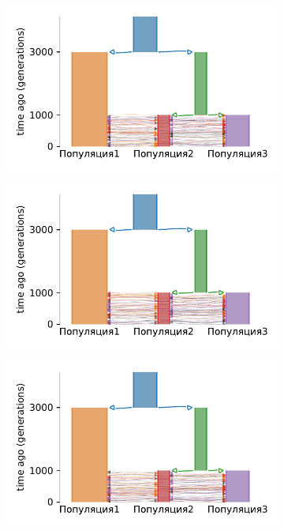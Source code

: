 \begin{figure}[ht!]
    \centering
    \begin{subfigure}[b]{.33\textwidth}
    \includegraphics[width=\textwidth]{images_experiments/simulation_1/3pop/picture_1pop_model_1_powell_over.pdf}
    \caption{}
    \label{fig:part2:experiments:simulated_3:results_model_1_1}
    \end{subfigure}%
    \begin{subfigure}[b]{.33\textwidth}
    \includegraphics[width=\textwidth]{images_experiments/simulation_1/3pop/picture_1pop_model_1_dadi_pipeline_over.pdf}
    \caption{}
    \label{fig:part2:experiments:simulated_3:results_model_1_2}
    \end{subfigure}%
    \begin{subfigure}[b]{.33\textwidth}
    \includegraphics[width=\textwidth]{images_experiments/simulation_1/3pop/picture_1pop_model_1_ga_over.pdf}

\end{subfigure}
\end{figure}

